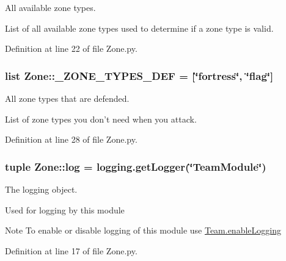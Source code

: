 \-All available zone types. 

\-List of all available zone types used to determine if a zone type is valid. 

\-Definition at line 22 of file \-Zone.\-py.

\hypertarget{namespace_zone_a97b1d1fa649bef78d253c8398e521c29}{
\subsubsection[{\-\_\-\-Z\-O\-N\-E\-\_\-\-T\-Y\-P\-E\-S\-\_\-\-D\-E\-F}]{\setlength{\rightskip}{0pt plus 5cm}list {\bf \-Zone\-::\-\_\-\-Z\-O\-N\-E\-\_\-\-T\-Y\-P\-E\-S\-\_\-\-D\-E\-F} = \mbox{[}\char`\"{}fortress\char`\"{}, \char`\"{}flag\char`\"{}\mbox{]}}}
\label{namespace_zone_a97b1d1fa649bef78d253c8398e521c29}


\-All zone types that are defended. 

\-List of zone types you don't need when you attack. 

\-Definition at line 28 of file \-Zone.\-py.

\hypertarget{namespace_zone_a612d8a61ed6769d3ea18d7883bcaaae6}{
\subsubsection[{log}]{\setlength{\rightskip}{0pt plus 5cm}tuple {\bf \-Zone\-::log} = logging.\-get\-Logger(\char`\"{}\-Team\-Module\char`\"{})}}
\label{namespace_zone_a612d8a61ed6769d3ea18d7883bcaaae6}


\-The logging object. 

\-Used for logging by this module \begin{DoxyNote}{\-Note}
\-To enable or disable logging of this module use \hyperlink{namespace_team_abaa01768200015ab5ae4afc3d2d54eec}{\-Team.\-enable\-Logging} 
\end{DoxyNote}


\-Definition at line 17 of file \-Zone.\-py.

